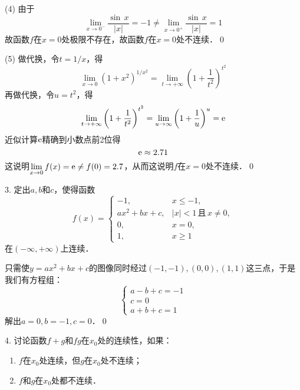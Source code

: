 (4) \prove 由于
\begin{equation}
    \lim_{x \to 0^-} \frac{\sin \, x}{\lvert x \rvert} = -1 \neq \lim_{x \to 0^+} \frac{\sin \, x}{\lvert x \rvert} = 1
\end{equation}
故函数$f$在$x=0$处极限不存在，故函数$f$在$x=0$处不连续．\qed\bigskip

(5) \prove 做代换，令$t=1/x$，得
\begin{equation}
    \lim_{x \to 0} \left(1+x^2\right)^{1/x^2} = \lim_{t \to +\infty} \left(1+\displaystyle\frac{1}{t^2}\right)^{t^2}
\end{equation}
再做代换，令$u=t^2$，得
\begin{equation}
    \lim_{t \to +\infty} \left(1+\displaystyle\frac{1}{t^2}\right)^{t^2}=\lim_{u \to \infty} \left(1+\displaystyle\frac{1}{u}\right)^u = \mathrm{e}
\end{equation}
近似计算$\mathrm{e}$精确到小数点前2位得
\begin{equation}
    \mathrm{e} \approx 2.71
\end{equation}
这说明$\displaystyle\lim_{x \to 0} f(x) = \mathrm{e} \neq f(0) = 2.7$，从而这说明$f$在$x=0$处不连续．\qed\bigskip

3. 定出$a,b$和$c$，使得函数
\begin{equation}
    f(x)=\begin{cases}
        -1, & x \leq -1, \\
        ax^2+bx+c, & \lvert x \rvert < 1 \, \text{且} \, x \neq 0, \\
        0, & x = 0, \\
        1, &x \geq 1
    \end{cases}
\end{equation}
在$(-\infty,+\infty)$上连续．

\bigskip
\solve 只需使$y = ax^2+bx+c$的图像同时经过$(-1,-1), (0,0), (1,1)$这三点，于是我们有方程组：
\begin{equation}
    \begin{cases}
        a-b+c=-1 \\
        c = 0 \\
        a+b+c=1
    \end{cases}
\end{equation}
解出$a=0,b=-1,c=0$．\qed\bigskip

4. 讨论函数$f+g$和$fg$在$x_0$处的连续性，如果：
\begin{enumerate}
    \item $f$在$x_0$处连续，但$g$在$x_0$处不连续；
    \item $f$和$g$在$x_0$处都不连续．
\end{enumerate}